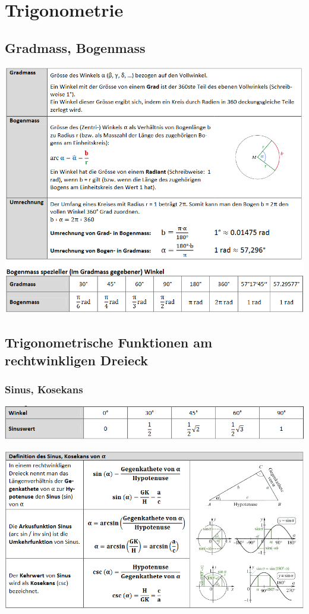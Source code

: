 \newpage{}

\section{Trigonometrie}
\subsection{Gradmass, Bogenmass}
\includegraphics[scale=0.7]{gradmass.PNG}
\subsection{Trigonometrische Funktionen am rechtwinkligen Dreieck}
\subsubsection{Sinus, Kosekans}
\includegraphics[scale=0.7]{sinkan1.PNG}

\includegraphics[scale=0.7]{sinkan2.PNG}
